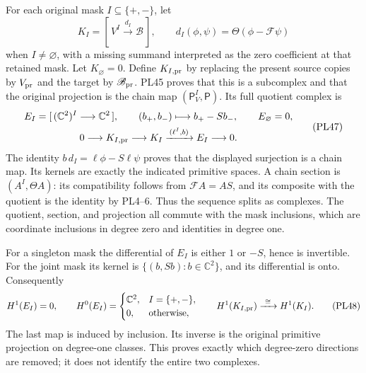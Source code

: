 \documentclass[11pt,a4paper]{article}
\theoremstyle{definition}\newtheorem{definition}[theorem]{Definition}
\newcommand{\C}{\mathbb C}\newcommand{\R}{\mathbb R}
\begin{document}
For each original mask \(I\subseteq\{+,-\}\), let
\[
 K_I=[\,V^{I}\xrightarrow{\,d_I\,}\mathscr B\,],\qquad
 d_I(\phi,\psi)=\Theta(\phi-\mathcal F\psi)
 \tag{PL46}
\]
when \(I\ne\varnothing\), with a missing summand interpreted as
the zero coefficient at that retained mask. Let \(K_\varnothing=0\).
Define \(K_{I,\rm pr}\) by replacing the present source copies by
\(V_{\rm pr}\) and the target by \(\mathscr B_{\rm pr}\).
PL45 proves that this is a subcomplex and that the original
projection is the chain map
\((\mathsf P_V^{I},\mathsf P)\).
Its full quotient complex is
\[
 \begin{gathered}
 E_I=[\,(\C^2)^{I}\longrightarrow\C^2\,],\qquad
 (b_+,b_-)\longmapsto b_+-Sb_-,\qquad E_\varnothing=0,\\
 0\longrightarrow K_{I,\rm pr}\longrightarrow K_I
       \xrightarrow{\,(\ell^{I},b)\,}E_I\longrightarrow0 .
 \end{gathered}
 \tag{PL47}\label{pl:pl:endpoint-complex}
\]
The identity \(b\,d_I=\ell\phi-S\ell\psi\) proves that the
displayed surjection is a chain map. Its kernels are exactly
the indicated primitive spaces. A chain section is
\((A^{I},\Theta A)\): its compatibility follows from
\(\mathcal F A=AS\), and its composite with the quotient is the
identity by PL4--6. Thus the sequence splits as complexes.
The quotient, section, and projection all commute with the mask
inclusions, which are coordinate inclusions in degree zero and
identities in degree one.

For a singleton mask the differential of \(E_I\) is either
\(1\) or \(-S\), hence is invertible. For the joint mask its kernel
is \(\{(b,Sb):b\in\C^2\}\), and its differential is onto. Consequently
\[
 H^1(E_I)=0,\qquad
 H^0(E_I)=
 \begin{cases}\C^2,& I=\{+,-\},\\0,&\text{otherwise},\end{cases}
 \qquad
 H^1(K_{I,\rm pr})\xrightarrow{\ \cong\ }H^1(K_I).
 \tag{PL48}\label{pl:pl:endpoint-cohomology}
\]
The last map is induced by inclusion. Its inverse is the original
primitive projection on degree-one classes. This proves exactly
which degree-zero directions are removed; it does not identify the
entire two complexes.
\end{document}
